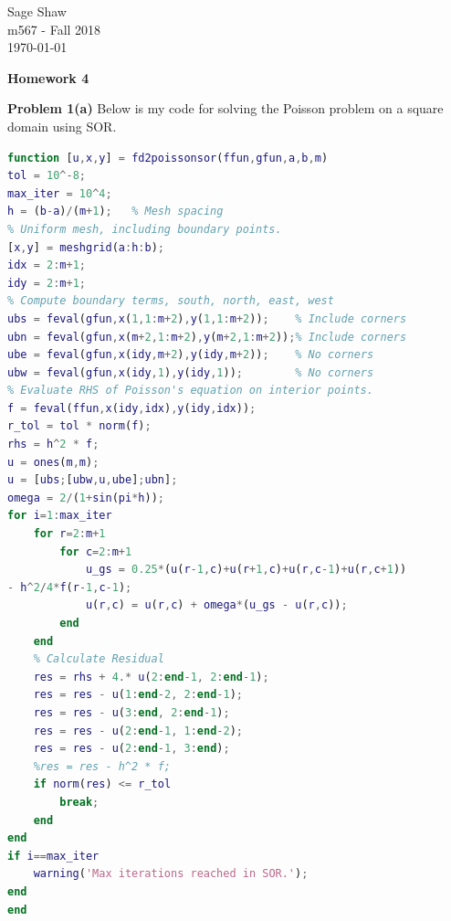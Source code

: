 \documentclass[12pt]{article}
\newcommand{\problem}[1]{\hspace{-4 ex} \large \textbf{Problem #1} }
\begin{document}
	\thispagestyle{empty}
	
	\begin{flushright}
		Sage Shaw \\
		m567 - Fall 2018 \\
		\today
	\end{flushright}
	
\begin{center}{\large \textbf{Homework 4}}\end{center}
\bigbreak

\hspace{-.5 ex}\problem{1(a)} Below is my code for solving the Poisson problem on a square domain using SOR.

\begin{lstlisting}[language=MATLAB]
function [u,x,y] = fd2poissonsor(ffun,gfun,a,b,m)
tol = 10^-8;
max_iter = 10^4;
h = (b-a)/(m+1);   % Mesh spacing
% Uniform mesh, including boundary points.
[x,y] = meshgrid(a:h:b);
idx = 2:m+1;
idy = 2:m+1;
% Compute boundary terms, south, north, east, west
ubs = feval(gfun,x(1,1:m+2),y(1,1:m+2));    % Include corners
ubn = feval(gfun,x(m+2,1:m+2),y(m+2,1:m+2));% Include corners
ube = feval(gfun,x(idy,m+2),y(idy,m+2));    % No corners
ubw = feval(gfun,x(idy,1),y(idy,1));        % No corners
% Evaluate RHS of Poisson's equation on interior points.
f = feval(ffun,x(idy,idx),y(idy,idx));
r_tol = tol * norm(f);
rhs = h^2 * f;
u = ones(m,m);
u = [ubs;[ubw,u,ube];ubn];
omega = 2/(1+sin(pi*h));
for i=1:max_iter
	for r=2:m+1
		for c=2:m+1
			u_gs = 0.25*(u(r-1,c)+u(r+1,c)+u(r,c-1)+u(r,c+1)) 
- h^2/4*f(r-1,c-1);
			u(r,c) = u(r,c) + omega*(u_gs - u(r,c));
		end
	end
	% Calculate Residual
	res = rhs + 4.* u(2:end-1, 2:end-1);
	res = res - u(1:end-2, 2:end-1);
	res = res - u(3:end, 2:end-1);
	res = res - u(2:end-1, 1:end-2);
	res = res - u(2:end-1, 3:end);
	%res = res - h^2 * f;
	if norm(res) <= r_tol
		break; 
	end
end
if i==max_iter
	warning('Max iterations reached in SOR.'); 
end
end
\end{lstlisting}
\bigbreak
\end{document}
